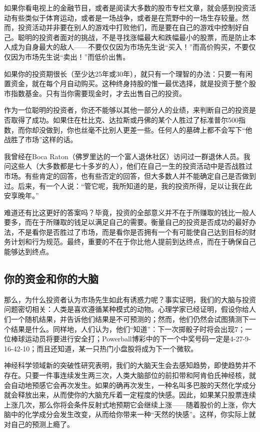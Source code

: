 \documentclass[12pt,oneside]{book}
\begin{document}
如果你看电视上的金融节目，或者是阅读大多数的股市专栏文章，就会感到投资活动有些类似于体育运动，或者是一场战争，或者是在荒野中的一场生存较量。然而，投资活动并非要在别人的游戏中打败他们，而是要在自己的游戏中控制好自己。聪明的投资者面对的挑战，不是寻找涨幅最大和跌幅最小的股票，而是防止本人成为自身最大的敌人——不要仅仅因为市场先生说“买入！”而高价购买，不要仅仅因为市场先生说“卖出！”而低价出售。

如果你的投资期很长（至少达25年或30年），就只有一个理智的办法：只要一有闲置资金，就在每个月自动购买。这种终身持股的惟一最优选择，就是投资于整个股市指数基金。只有当你需要现金时，才去出售自己的投资。

作为一位聪明的投资者，你还不能够以其他一部分人的业绩，来判断自己的投资是否取得了成功。如果住在杜比克、达拉斯或丹佛的某个人胜过了标准普尔500指数，而你却没做到，你也丝毫不比别人更差一些。任何人的墓碑上都不会写下“他战胜了市场”这样的话。

我曾经在Boca Raton（佛罗里达的一个富人退休社区）访问过一群退休人员。我问这些人（大多数都是七十多岁的人），他们在自己一生的投资活动中是否战胜过市场。有些肯定的回答，也有些否定的回答，但大多数人并不能确定自己是否做到过。后来，有一个人说：“管它呢，我所知道的是，我的投资所得，足以让我在此安享晚年。”

难道还有比这更好的答案吗？毕竟，投资的全部意义并不在于所赚取的钱比一般人要多，而在于所赚取的钱足以满足自己的需要。衡量自己的投资是否成功的最好办法，不是看你是否胜过了市场，而是看你是否拥有一个有可能使自己达到目标的财务计划和行为规范。最终，重要的不在于你比他人提前到达终点，而在于确保自己能够达到终点。

\subsection{你的资金和你的大脑}
那么，为什么投资者认为市场先生如此有诱惑力呢？事实证明，我们的大脑与投资问题密切相关：人类是喜欢遵循某种模式的动物。心理学家已经证明，假设你给人们一个随机结果，并告诉他们结果是不可预测的；然而，他们仍然会试图猜测下一个结果是什么。同样地，人们认为，他们“知道”：下一次掷骰子时将会出现7；一位棒球运动员将要进行安全打；Powerball博彩中的下一个中奖号码一定是4-27-9-16-42-10；而且还知道，某一只热门小盘股将成为下一个微软。

神经科学领域新的突破性研究表明，我们的大脑天生会去感知趋势，即使趋势并不存在。只要一件事连续发生两三次，人类大脑部位的前扣带和阿肯伯氏神经核，就会自动地预感它会再次发生。如果的确再次发生，一种名叫多巴胺的天然化学成分就会释放出来，从而使你的大脑充斥着一定程度的快感。因此，如果某只股票连续上涨几次，那么你将会条件反射式地预期它会继续上涨——随着股价的上涨，你大脑中的化学成分会发生改变，从而给你带来一种“天然的快感”。这样，你实际上就对自己的预测上瘾了。
\end{document}
